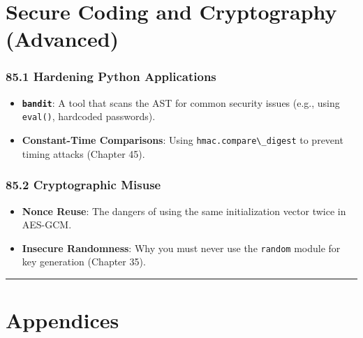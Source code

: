 \hypertarget{secure-coding-and-cryptography-advanced}{%
\chapter{Secure Coding and Cryptography
(Advanced)}\label{secure-coding-and-cryptography-advanced}}

\hypertarget{hardening-python-applications}{%
\subsection{85.1 Hardening Python
Applications}\label{hardening-python-applications}}

\begin{itemize}
\tightlist
\item
  \textbf{\passthrough{\lstinline!bandit!}}: A tool that scans the AST
  for common security issues (e.g., using
  \passthrough{\lstinline!eval()!}, hardcoded passwords).
\item
  \textbf{Constant-Time Comparisons}: Using
  \passthrough{\lstinline!hmac.compare\_digest!} to prevent timing
  attacks (Chapter 45).
\end{itemize}

\hypertarget{cryptographic-misuse}{%
\subsection{85.2 Cryptographic Misuse}\label{cryptographic-misuse}}

\begin{itemize}
\tightlist
\item
  \textbf{Nonce Reuse}: The dangers of using the same initialization
  vector twice in AES-GCM.
\item
  \textbf{Insecure Randomness}: Why you must never use the
  \passthrough{\lstinline!random!} module for key generation (Chapter
  35).
\end{itemize}

\begin{center}\rule{0.5\linewidth}{0.5pt}\end{center}

\hypertarget{appendices}{%
\chapter{Appendices}\label{appendices}}
